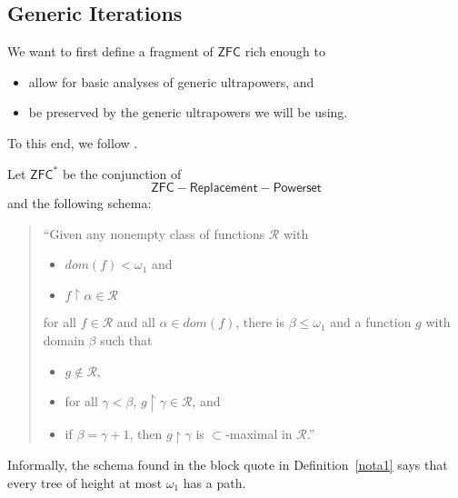 \documentclass[12pt]{article}
\numberwithin{equation}{section}
\begin{document}
\subsection{Generic Iterations}

We want to first define a fragment of $\mathsf{ZFC}$ rich enough to 
\begin{itemize}
    \item allow for basic analyses of generic ultrapowers, and
    \item be preserved by the generic ultrapowers we will be using.
\end{itemize}
To this end, we follow \cite[Section 3.1]{woodin}.

\begin{defi}[Woodin]\label{nota1}
Let $\mathsf{ZFC}^*$ be the conjunction of $$\mathsf{ZFC} - \mathsf{Replacement} - \mathsf{Powerset}$$ and the following schema:
\begin{quote}
    ``Given any nonempty class of functions $\mathcal{R}$ with
    \begin{itemize}
        \item $dom(f) < \omega_1$ and
        \item $f \restriction \alpha \in \mathcal{R}$
    \end{itemize}
    for all $f \in \mathcal{R}$ and all $\alpha \in dom(f)$, there is $\beta \leq \omega_1$ and a function $g$ with domain $\beta$ such that
    \begin{itemize}
        \item $g \not \in \mathcal{R}$,
        \item for all $\gamma < \beta$, $g \restriction \gamma \in \mathcal{R}$, and
        \item if $\beta = \gamma + 1$, then $g \restriction \gamma$ is $\subset$-maximal in $\mathcal{R}$.''
    \end{itemize}
\end{quote}
\end{defi}

Informally, the schema found in the block quote in Definition~\ref{nota1} says that every tree of height at most $\omega_1$ has a path.
\end{document}
